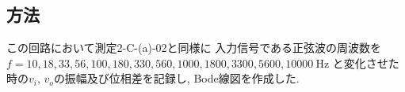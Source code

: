 \subsection{方法}
この回路において測定2-C-(a)-02と同様に
入力信号である正弦波の周波数を$f=10,18,33,56,100,180,330,560,1000,1800,3300,5600,10000\ \si{\hertz}$
と変化させた時の$v_i$, $v_o$の振幅及び位相差を記録し, Bode線図を作成した.